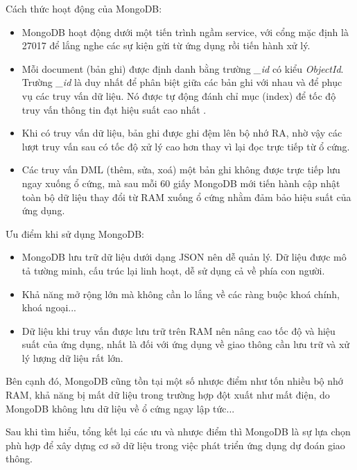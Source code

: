 Cách thức hoạt động của MongoDB:
\begin{itemize}
    \item MongoDB hoạt động dưới một tiến trình ngầm service, với cổng mặc định là 27017 để lắng nghe các sự kiện gửi từ ứng dụng rồi tiến hành xử lý.
    \item Mỗi document (bản ghi) được định danh bằng trường \textit{\_id} có kiểu \textit{ObjectId}. Trường \textit{\_id} là duy nhất để phân biệt giữa các bản ghi với nhau và để phục vụ các truy vấn dữ liệu. Nó được tự động đánh chỉ mục (index) để tốc độ truy vấn thông tin đạt hiệu suất cao nhất \cite{MongoDB2}.
    \item Khi có truy vấn dữ liệu, bản ghi được ghi đệm lên bộ nhớ RA, nhờ vậy các lượt truy vấn sau có tốc độ xử lý cao hơn thay vì lại đọc trực tiếp từ ổ cứng.
    \item Các truy vấn DML (thêm, sửa, xoá) một bản ghi không được trực tiếp lưu ngay xuống ổ cứng, mà sau mỗi 60 giấy MongoDB mới tiến hành cập nhật toàn bộ dữ liệu thay đổi từ RAM xuống ổ cứng \cite{MongoDB3} nhằm đảm bảo hiệu suất của ứng dụng.
\end{itemize}

Ưu điểm khi sử dụng MongoDB:
\begin{itemize}
    \item MongoDB lưu trữ dữ liệu dưới dạng JSON nên dễ quản lý. Dữ liệu được mô tả tường minh, cấu trúc lại linh hoạt, dễ sử dụng cả về phía con người.
    \item Khả năng mở rộng lớn mà không cần lo lắng về các ràng buộc khoá chính, khoá ngoại...
    \item Dữ liệu khi truy vấn được lưu trữ trên RAM nên nâng cao tốc độ và hiệu suất của ứng dụng, nhất là đối với ứng dụng về giao thông cần lưu trữ và xử lý lượng dữ liệu rất lớn.
\end{itemize}

Bên cạnh đó, MongoDB cũng tồn tại một số nhược điểm như tốn nhiều bộ nhớ RAM, khả năng bị mất dữ liệu trong trường hợp đột xuất như mất điện, do MongoDB không lưu dữ liệu về ổ cứng ngay lập tức... 

Sau khi tìm hiểu, tổng kết lại các ưu và nhược điểm thì MongoDB là sự lựa chọn phù hợp để xây dựng cơ sở dữ liệu trong việc phát triển ứng dụng dự đoán giao thông.

